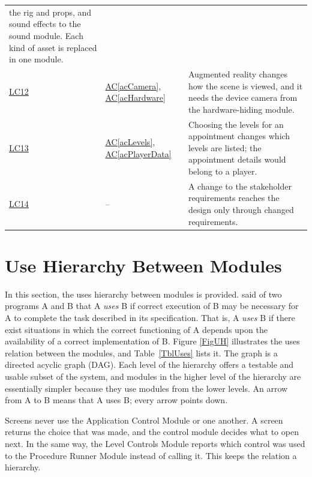 \documentclass[12pt, titlepage]{article}
\newcommand{\acref}[1]{\hyperref[#1]{AC\ref*{#1}}}
\newcommand{\srsurl}{https://team-hindsight.github.io/ophthamology-game/SRS/SRS.pdf}
\newcommand{\srsitemref}[2]{\href{\srsurl\#nameddest=#1}{#2}}
\begin{document}
\begin{longtable}{p{} p{} p{}}
the rig and props, and sound effects to the sound module. Each kind of asset is
replaced in one module.\\
\srsitemref{LC_AR}{LC12} & \acref{acCamera}, \acref{acHardware} & Augmented
reality changes how the scene is viewed, and it needs the device camera from the
hardware-hiding module.\\
\srsitemref{LC_Personalization}{LC13} & \acref{acLevels}, \acref{acPlayerData}
& Choosing the levels for an appointment changes which levels are listed; the
appointment details would belong to a player.\\
\srsitemref{LC_Stakeholders}{LC14} & -- & A change to the stakeholder
requirements reaches the design only through changed requirements.\\
\bottomrule
\end{longtable}

\section{Use Hierarchy Between Modules} \label{SecUse}

In this section, the uses hierarchy between modules is
provided. \citet{Parnas1978} said of two programs A and B that A {\em uses} B if
correct execution of B may be necessary for A to complete the task described in
its specification. That is, A {\em uses} B if there exist situations in which
the correct functioning of A depends upon the availability of a correct
implementation of B.  Figure \ref{FigUH} illustrates the uses relation between
the modules, and Table~\ref{TblUses} lists it. The graph is a directed acyclic
graph (DAG). Each level of the hierarchy offers a testable and usable subset of
the system, and modules in the higher level of the hierarchy are essentially
simpler because they use modules from the lower levels. An arrow from A to B
means that A uses B; every arrow points down.

Screens never use the Application Control Module or one another. A screen
returns the choice that was made, and the control module decides what to open
next. In the same way, the Level Controls Module reports which control was used
to the Procedure Runner Module instead of calling it. This keeps the relation a
hierarchy.
\end{document}
